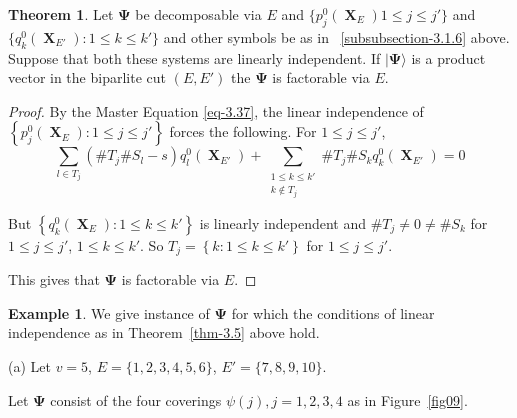 \documentclass[a4paper,12pt]{article}
\DeclareMathOperator{\x}{\mathrm{X}}
\theoremstyle{definition}
\theoremstyle{underlinethm}
\newtheorem{thm}{Theorem}[section]
\newtheorem{example}{Example}[section]
\theoremstyle{definition}
\begin{document}
\begin{thm}\label{thm-3.5}
Let $\boldsymbol{\Psi}$ be decomposable via $E$ and $\{p_{j}^{0}(\boldsymbol{\x}_{E}) 1 \leq j \leq j'\}$ and $\{q_{k}^{0} (\boldsymbol{\x}_{E'}) : 1 \leq k \leq k'\}$ and other symbols be as in ~\eqref{subsubsection-3.1.6} above. Suppose that both these systems are linearly independent. If $| \boldsymbol{\Psi} \rangle$ is a product vector in the biparlite cut $(E, E')$ the $\boldsymbol{\Psi}$ is factorable via $E$.
\end{thm}

\begin{proof}
By the Master Equation \eqref{eq-3.37}, the linear independence of\\ $\left\{p_{j}^{0} (\boldsymbol{\x}_{E}) : 1 \leq j \leq j'\right\}$ forces the following. For $1 \leq j \leq j'$,  
\begin{equation}
\sum\limits_{l\in T_{j}} (\# T_{j} \# S_{l}-s) q_{l}^{0}(\boldsymbol{\x}_{E'}) + \sum_{\substack{1 \leq k \leq k'\\ k \notin T_{j}}} \# T_{j} \# S_{k} q_{k}^{0}(\boldsymbol{\x}_{E'}) = 0\tag{3.40}\label{eq-3.40} 
\end{equation}

But $\left\{q_{k}^{0}(\boldsymbol{\x}_{E}): 1 \leq k \leq k' \right\}$ is linearly independent and $\# T_{j} \neq 0 \neq \# S_{k}$ for $1 \leq j \leq j'$, $1 \leq k \leq k'$. So $T_{j} = \left\{k : 1 \leq k \leq k'\right\}$ for $1 \leq j \leq j'$.

This gives that $\boldsymbol{\Psi}$ is factorable via $E$.
\end{proof}

\begin{example}\label{example-3.3}
We give instance of $\boldsymbol{\Psi}$ for which the conditions of linear independence as in Theorem~\eqref{thm-3.5} above hold. 

(a) Let $v=5$, $E = \{1,2,3,4,5,6\}$, $E' = \{7,8,9,10\}$.

Let $\boldsymbol{\Psi}$ consist of the four coverings $\psi (j), j = 1,2,3,4$ as in Figure~\eqref{fig09}.
\end{example}
\end{document}
